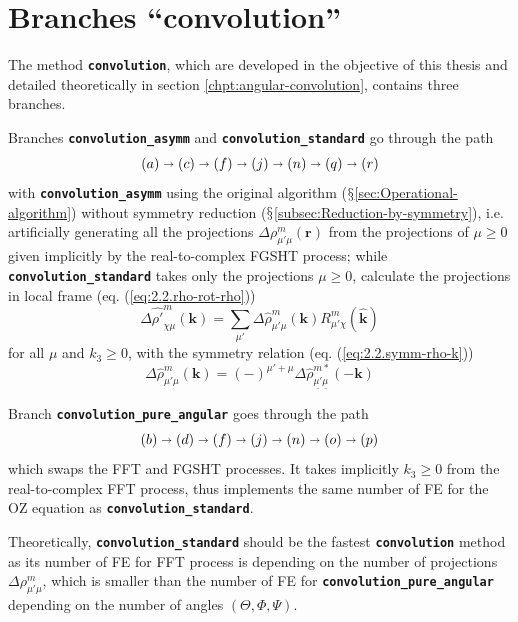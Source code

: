 \section{Branches ``convolution''}

The method \texttt{\textbf{convolution}}, which are developed in the
objective of this thesis and detailed theoretically in section \ref{chpt:angular-convolution},
contains three branches.

Branches\textbf{ }\texttt{\textbf{convolution\_asymm}} and \texttt{\textbf{convolution\_standard}}
go through the path
\[
\left(a\right)\shortrightarrow\left(c\right)\shortrightarrow\left(f\right)\shortrightarrow\left(j\right)\shortrightarrow\left(n\right)\shortrightarrow\left(q\right)\shortrightarrow\left(r\right)
\]
with \texttt{\textbf{convolution\_asymm}} using the original algorithm
($\mathsection$\ref{sec:Operational-algorithm}) without symmetry
reduction ($\mathsection$\ref{subsec:Reduction-by-symmetry}), i.e.
artificially generating all the projections $\Delta\rho_{\mu'\mu}^{m}(\mathbf{r})$
from the projections of $\mu\geq0$ given implicitly by the real-to-complex
\acs{FGSHT} process; while \texttt{\textbf{convolution\_standard}}
takes only the projections $\mu\geq0$, calculate the projections
in local frame (eq. (\ref{eq:2.2.rho-rot-rho}))
\begin{equation}
\Delta\hat{\rho'}_{\chi\mu}^{m}(\mathbf{k})=\sum_{\mu'}\Delta\hat{\rho}_{\mu'\mu}^{m}(\mathbf{k})R_{\mu'\chi}^{m}(\mathbf{\hat{k}})
\end{equation}
 for all $\mu$ and $k_{3}\geq0$, with the symmetry relation (eq.
(\ref{eq:2.2.symm-rho-k}))
\begin{equation}
\Delta\hat{\rho}_{\mu'\mu}^{m}(\mathbf{k})=(-)^{\mu'+\mu}\Delta\hat{\rho}_{\underline{\mu'}\underline{\mu}}^{m*}(-\mathbf{k})
\end{equation}

Branch \texttt{\textbf{convolution\_pure\_angular}} goes through the
path 
\[
\left(b\right)\shortrightarrow\left(d\right)\shortrightarrow\left(f\right)\shortrightarrow\left(j\right)\shortrightarrow\left(n\right)\shortrightarrow\left(o\right)\shortrightarrow\left(p\right)
\]
which swaps the \acs{FFT} and \acs{FGSHT} processes. It takes implicitly
$k_{3}\geq0$ from the real-to-complex \acs{FFT} process, thus implements
the same number of \acs{FE} for the \acs{OZ} equation as \texttt{\textbf{convolution\_standard}}.

Theoretically, \texttt{\textbf{convolution\_standard}} should be the
fastest \texttt{\textbf{convolution}} method as its number of \acs{FE}
for \acs{FFT} process is depending on the number of projections $\Delta\rho_{\mu'\mu}^{m}$,
which is smaller than the number of \acs{FE} for \texttt{\textbf{convolution\_pure\_angular}}
depending on the number of angles $(\Theta,\Phi,\Psi)$.

